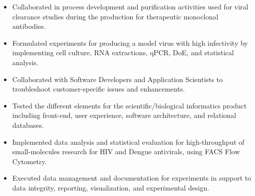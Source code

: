 \documentclass[10pt,a4paper]{altacv}
\begin{document}



\begin{itemize}
    \item   \small{Collaborated in process development and purification activities used for viral clearance studies during the production for therapeutic monoclonal antibodies.}
    \item   \small{Formulated experiments for producing a model virus with high infectivity by implementing cell culture, RNA extractions, qPCR, DoE, and statistical analysis.}
\end{itemize}

\medskip



\begin{itemize}
    \item   \small{Collaborated with Software Developers and Application Scientists to troubleshoot customer-specific issues and enhancements.}
    \item   \small{Tested the different elements for the scientific/biological informatics product including front-end, user experience, software architecture, and relational databases.}
\end{itemize}

\medskip




\begin{itemize}
    \item   \small{Implemented data analysis and statistical evaluation for high-throughput of small-molecules research for HIV and Dengue antivirals, using FACS Flow Cytometry.}
    \item   \small{Executed data management and documentation for experiments in support to data integrity, reporting, visualization, and experimental design.}
    
\end{itemize}
\end{document}
